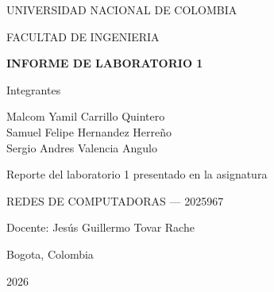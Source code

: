 

\begin{titlepage}
\centering

\vspace*{4cm}

{\large
UNIVERSIDAD NACIONAL DE COLOMBIA
}

\vspace{1cm}

{\large
FACULTAD DE INGENIERIA
}

\vspace{3cm}

{\Large
\textbf{INFORME DE LABORATORIO 1}
}

\vspace{3cm}

{\large
Integrantes
}

\vspace{0.5cm}

{\large
Malcom Yamil Carrillo Quintero \\
Samuel Felipe Hernandez Herreño \\
Sergio Andres Valencia Angulo
}

\vspace{3cm}

{\large
Reporte del laboratorio 1 presentado en la asignatura
}

\vspace{0.5cm}

{\large
REDES DE COMPUTADORAS — 2025967
}

\vspace{0.5cm}

{\large
Docente: Jesús Guillermo Tovar Rache
}

\vfill

{\large
Bogota, Colombia
}

\vspace{0.3cm}

{\large
2026
}

\end{titlepage}
